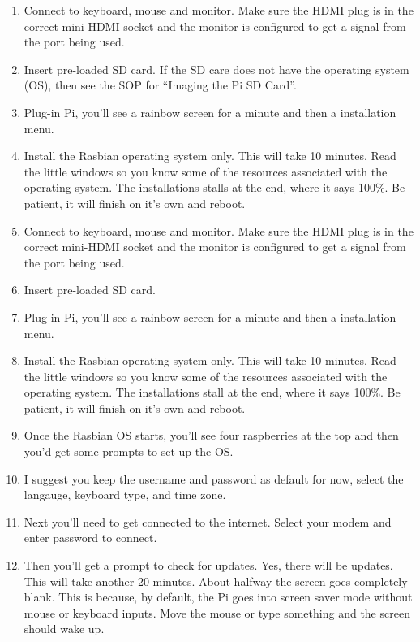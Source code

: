 \documentclass{article}\usepackage[]{graphicx}\usepackage[]{color}
\begin{document}
\begin{enumerate}

\item Connect to keyboard, mouse and monitor. Make sure the HDMI plug is in the correct mini-HDMI socket and the monitor is configured to get a signal from the port being used. 
\item Insert pre-loaded SD card. If the SD care does not have the operating system (OS), then see the SOP for ``Imaging the Pi SD Card''. 

\item Plug-in Pi, you'll see a rainbow screen for a minute and then a installation menu. 

\item Install the Rasbian operating system only. This will take 10 minutes. Read the little windows so you know some of the resources associated with the operating system. The installations stalls at the end, where it says 100\%. Be patient, it will finish on it's own and reboot.

\item Connect to keyboard, mouse and monitor. Make sure the HDMI plug is in the correct mini-HDMI socket and the monitor is configured to get a signal from the port being used.

\item Insert pre-loaded SD card.

\item Plug-in Pi, you'll see a rainbow screen for a minute and then a installation menu. 

\item Install the Rasbian operating system only. This will take 10 minutes. Read the little windows so you know some of the resources associated with the operating system. The installations stall at the end, where it says 100\%. Be patient, it will finish on it's own and reboot.

\item Once the Rasbian OS starts, you'll see four raspberries at the top and then you'd get some prompts to set up the OS. 

\item I suggest you keep the username and password as default for now, select the langauge, keyboard type, and time zone. 

\item Next you'll need to get connected to the internet. Select your modem and enter password to connect.

\item Then you'll get a prompt to check for updates. Yes, there will be updates. This will take another 20 minutes. About halfway the screen goes completely blank. This is because, by default, the Pi goes into screen saver mode without mouse or keyboard inputs. Move the mouse or type something and the screen should wake up. 


\end{enumerate}
\end{document}
